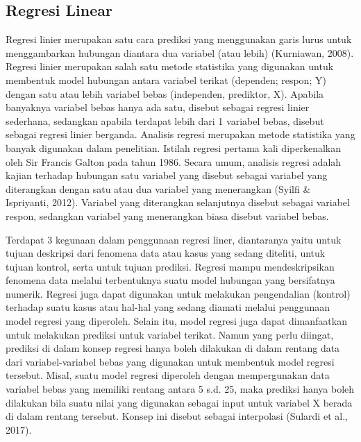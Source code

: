 \subsection{Regresi Linear}

Regresi linier merupakan satu cara prediksi yang menggunakan garis lurus untuk menggambarkan hubungan diantara dua variabel (atau lebih) (Kurniawan, 2008). Regresi linier merupakan salah satu metode statistika yang digunakan untuk membentuk model hubungan antara variabel terikat (dependen; respon; Y) dengan satu atau lebih variabel bebas (independen, prediktor, X).  Apabila banyaknya variabel bebas hanya ada satu, disebut sebagai regresi linier sederhana, sedangkan apabila terdapat lebih dari 1 variabel bebas, disebut sebagai regresi linier berganda. Analisis regresi merupakan metode statistika yang banyak digunakan dalam penelitian. Istilah regresi pertama kali diperkenalkan oleh Sir Francis Galton pada tahun 1986.  Secara umum, analisis regresi adalah kajian terhadap hubungan satu variabel yang disebut sebagai variabel yang diterangkan dengan satu atau dua variabel yang menerangkan (Syilfi \& Ispriyanti, 2012). Variabel yang diterangkan selanjutnya disebut sebagai variabel respon, sedangkan variabel yang menerangkan biasa disebut variabel bebas. 

Terdapat 3 kegunaan dalam penggunaan regresi liner, diantaranya yaitu untuk tujuan deskripsi dari fenomena data atau kasus yang sedang diteliti, untuk tujuan kontrol, serta untuk tujuan prediksi. Regresi mampu mendeskripsikan fenomena data melalui terbentuknya suatu model hubungan yang bersifatnya numerik. Regresi juga dapat digunakan untuk melakukan pengendalian (kontrol) terhadap suatu kasus atau hal-hal yang sedang diamati melalui penggunaan model regresi yang diperoleh. Selain itu, model regresi juga dapat dimanfaatkan untuk melakukan prediksi untuk variabel terikat. Namun yang perlu diingat, prediksi di dalam konsep regresi hanya boleh dilakukan di dalam rentang data dari variabel-variabel bebas yang digunakan untuk membentuk model regresi tersebut. Misal, suatu model regresi diperoleh dengan mempergunakan data variabel bebas yang memiliki rentang antara 5 s.d. 25, maka prediksi hanya boleh dilakukan bila suatu nilai yang digunakan sebagai input untuk variabel X berada di dalam rentang tersebut. Konsep ini disebut sebagai interpolasi (Sulardi et al., 2017).

